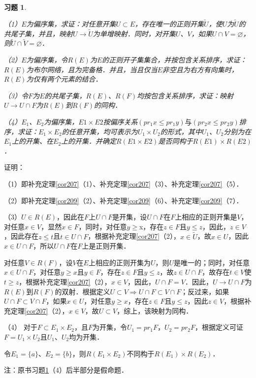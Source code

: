 \documentclass[12pt, a4paper, oneside]{book}
\newtheorem{exer}{习题}
\begin{document}
			\begin{exer}\label{exer98}
				\hfill\par
				（1）$E$为偏序集，求证：对任意开集$U\subset E$，存在唯一的正则开集$\tilde{U}$，使$U$为$\tilde{U}$的共尾子集，并且，映射$U\to \tilde{U}$为单增映射．同时，对开集$U$、$V$，如果$U\cap V=\varnothing$，则$\tilde{U}\cap \tilde{V}=\varnothing$．
				\par
				（2）$E$为偏序集，令$R(E)$为$E$的正则开子集集合，并按包含关系排序，求证：$R(E)$为布尔网络，且为完备格．并且，当且仅当$E$非空且为右方有向集时，$R(E)$为仅有两个元素的结合．
				\par
				（3）令$F$为$E$的共尾子集，$R(E)$、$R(F)$均按包含关系排序，求证：映射$U\to U\cap F$为$R(E)$到$R(F)$的同构．
				\par
				（4）$E_1$、$E_2$为偏序集，$E1\times E2$按偏序关系$(pr_1x\leq pr_1y)\text{与}(pr_2x\leq pr_2y)$排序，求证：$E_1\times E_2$的任意开集，均可表示为$U_1\times U_2$的形式，其中$U_1$、$U_2$分别为在$E_1$上的开集、在$E_2$上的开集．并确定$R(E1\times E2)$是否同构于$R(E1)\times R(E2)$．
			\end{exer}
			证明：
			\par
			（1）即补充定理\ref{cor207}（1）、补充定理\ref{cor207}（3）、补充定理\ref{cor207}（5）．
			\par
			（2）即补充定理\ref{cor209}（2）、补充定理\ref{cor209}（6）、补充定理\ref{cor209}（7）．
			\par
			（3）$U\in R(E)$，因此在$F$上$U\cap F$是开集，设$U\cap F$在$F$上相应的正则开集是$V$，对任意$x\in V$，显然$x\in F$，同时，对任意$y\geq $x，存在$z\in F$且$y\leq z$，因此，$z\in V$，因此存在$z\leq t$且$t\in U\cap F$，根据补充定理\ref{cor207}（2），$x\in \tilde{U}$，故$x\in U$，因此$x\in U\cap F$，所以$U\cap F$在$F$上是正则开集．
			\par
			对任意$V\in R(F)$，设$V$在$E$上相应的正则开集为$U$，则$U$是唯一的；同时，对任意$x\in U\cap F$，对任意$y\geq x$且$y\in F$，存在$z\in F$且$y\leq z$，故$z\in U\cap F$，故存在$t\in V$使$t\geq z$，根据补充定理\ref{cor207}（2），$x\in V$，因此，$U\cap F=V$．因此，$U\to U\cap F$为$R(E)$到$R(F)$的双射．根据定义$U\subset V\Rightarrow U\cap F\subset V\cap F$；反过来，如果$U\cap F\subset V\cap F$，如果$x\in U$，对任意$y\geq x$，存在$z\in F$且$y\leq z$，因此$z\in V$，根据补充定理\ref{cor207}（2），$x\in V$，故$U\subset V$，综上，该映射为同构．
			\par
			（4）	对于$F\subset E_1\times E_2$，且$F$为开集，令$U_1=pr_1F$，$U_2=pr_2F$，根据定义可证$F=U_1\times U_2$且$U_1$、$U_2$均为开集．
			\par
			令$E_1=\{a\}$、$E_2=\{b\}$，则$R(E_1\times E_2)$不同构于$R(E_1)\times R(E_2)$．
			\par
			注：原书习题\ref{exer98}（4）后半部分是假命题．
			
\end{document}
